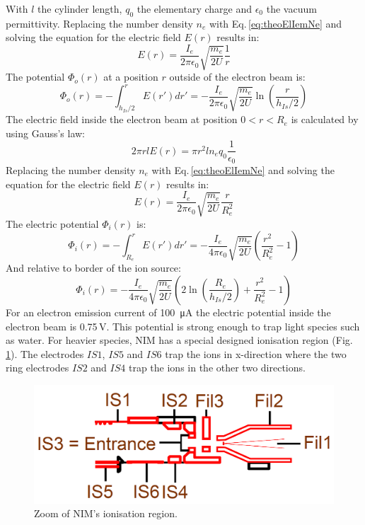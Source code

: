 	With $l$ the cylinder length, $q_0$ the elementary charge and $\epsilon_0$ the vacuum permittivity. Replacing the number density $n_e$ with Eq.\,\eqref{eq:theoElIemNe} and solving the equation for the electric field $E(r)$ results in:
	\begin{equation}
		E(r) = \frac{I_e}{2 \pi \epsilon_0} \sqrt{\frac{m_e}{2U}}\frac{1}{r}
	\end{equation}
	The potential $\Phi_o (r)$ at a position $r$ outside of the electron beam is:
	\begin{equation}
		\Phi_o (r) = -\int_{h_{Is}/2}^{r} E(r') dr' = -\frac{I_e}{2\pi\epsilon_0}\sqrt{\frac{m_e}{2U}}\ln\left(\frac{r}{h_{Is}/2}\right)
	\end{equation}
	The electric field inside the electron beam at position $0<r<R_e$ is calculated by using Gauss's law:
	\begin{equation}
		2\pi r l E(r) = \pi r^2 l n_e q_0 \frac{1}{\epsilon_0}
	\end{equation}
	Replacing the number density $n_e$ with Eq.\,\eqref{eq:theoElIemNe} and solving the equation for the electric field $E(r)$ results in:
	\begin{equation}
		E(r) = \frac{I_e}{2\pi\epsilon_0}\sqrt{\frac{m_e}{2U}}\frac{r}{R_e^2}
	\end{equation}
	The electric potential $\Phi_i (r)$ is:
	\begin{equation}
		\Phi_i (r) = -\int_{R_e}^{r} E(r') dr' = -\frac{I_e}{4\pi\epsilon_0}\sqrt{\frac{m_e}{2U}}\left(\frac{r^2}{R_e^2} -1 \right)
	\end{equation}
	And relative to border of the ion source:
	\begin{equation}
		\Phi_i (r) = -\frac{I_e}{4\pi\epsilon_0}\sqrt{\frac{m_e}{2U}}\left(2\ln\left(\frac{R_e}{h_{Is}/2}\right) +\frac{r^2}{R_e^2} -1 \right)
		\label{eq:elPotIem}
	\end{equation}
	For an electron emission current of 100~\si{\micro\ampere} the electric potential inside the electron beam is 0.75\,\si{\volt}. This potential is strong enough to trap light species such as water. For heavier species, NIM has a special designed ionisation region (Fig.\,\ref{fig:ISZoom}). The electrodes $IS 1$, $IS 5$ and $IS 6$ trap the ions in x-direction where the two ring electrodes $IS 2$ and $IS 4$ trap the ions in the other two directions.		
	\begin{figure}[h]
		\centering
		\includegraphics[width= .5\textwidth]{Bilder/NIM_schema_zoom_IS.png}
		\caption{Zoom of NIM's ionisation region.}
		\label{fig:ISZoom}
	\end{figure}
